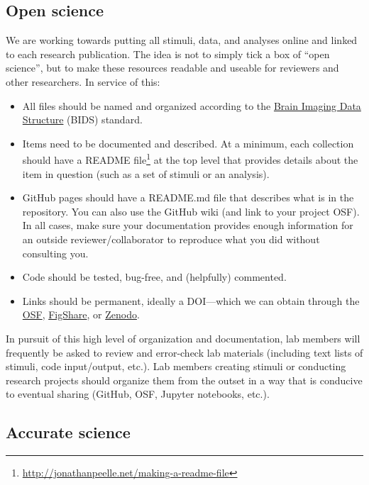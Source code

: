 \documentclass[letterpaper,12pt,oneside]{memoir}
\begin{document}
\subsection{Open science}

We are working towards putting all stimuli, data, and analyses online and linked to each research publication. The idea is not to simply tick a box of ``open science'', but to make these resources readable and useable for reviewers and other researchers. In service of this:

\begin{itemize}
\item All files should be named and organized according to the \href{https://bids.neuroimaging.io/}{Brain Imaging Data Structure} (BIDS) standard.

\item Items need to be documented and described. At a minimum, each collection should have a README file\footnote{\url{http://jonathanpeelle.net/making-a-readme-file}} at the top level that provides details about the item in question (such as a set of stimuli or an analysis).

\item GitHub pages should have a README.md file that describes what is in the repository. You can also use the GitHub wiki (and link to your project OSF). In all cases, make sure your documentation provides enough information for an outside reviewer/collaborator to reproduce what you did without consulting you.

\item Code should be tested, bug-free, and (helpfully) commented.

\item Links should be permanent, ideally a DOI---which we can obtain through the \href{http://help.osf.io/m/sharing/l/524208-create-dois-and-arks}{OSF}, \href{https://figshare.com/}{FigShare}, or \href{https://zenodo.org/}{Zenodo}.
\end{itemize}

In pursuit of this high level of organization and documentation, lab members will frequently be asked to review and error-check lab materials (including text lists of stimuli, code input/output, etc.). Lab members creating stimuli or conducting research projects should organize them from the outset in a way that is conducive to eventual sharing (GitHub, OSF, Jupyter notebooks, etc.).


\subsection{Accurate science}
\end{document}
